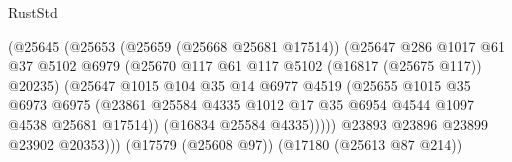 \begin{lexlean}{RustStd}
\begin{coremodule}
{\begin{coremodule}
{{{{{{{{{{{{{{{{{{{{{{{{{{{{{{{{{{{{{{{{{{{{{{{{{{{{{{{                                      (@25645
                                        (@25653
                                          (@25659 (@25668 @25681 @17514))
                                          (@25647
                                            @286
                                            @1017
                                            @61
                                            @37
                                            @5102
                                            @6979
                                            (@25670
                                              @117
                                              @61
                                              @117
                                              @5102
                                              (@16817 (@25675 @117))
                                              @20235)
                                            (@25647
                                              @1015
                                              @104
                                              @35
                                              @14
                                              @6977
                                              @4519
                                              (@25655
                                                @1015
                                                @35
                                                @6973
                                                @6975
                                                (@23861
                                                  @25584
                                                  @4335
                                                  @1012
                                                  @17
                                                  @35
                                                  @6954
                                                  @4544
                                                  @1097
                                                  @4538
                                                  @25681
                                                  @17514))
                                              (@16834 @25584 @4335)))))
                                      @23893
                                      @23896
                                      @23899
                                      @23902
                                      @20353)))
                                (@17579 (@25608 @97))
                                (@17180 (@25613 @87 @214))
}}}}}}}}}}}}}}}}}}}}}}}}}}}}}}}}}}}}}}}}}}}}}}}}}}}}}}}
\end{coremodule}}
\end{coremodule}
\end{lexlean}
